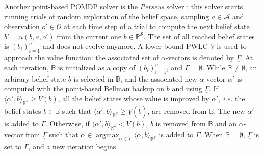 Another point-based POMDP solver is the \textit{Perseus} solver \cite{Spaan04techrep}:
this solver starts running trials of random exploration of the belief space,
sampling $a \in \mathcal{A}$ and observation $o' \in \mathcal{O}$ at each time step of a trial 
to compute the next belief state $b'=u(b,a,o')$ from the current one $b \in \mathbb{P}^{\mathcal{S}}$.
The set of all reached belief states is $(b_i)_{i=1}^{n}$ and does not evolve anymore. 
A lower bound PWLC $\underline{V}$ is used to approach the value function:
the associated set of $\alpha$-vectors is denoted by $\underline{\Gamma}$.
At each iteration, $\mathbb{B}$ is initialized as a copy of $(b_i)_{i=1}^{n}$,
and $\Gamma = \emptyset$. 
While $\mathbb{B} \neq \emptyset$, an arbirary belief state $b$ is selected in $\mathbb{B}$,
and the associated new $\alpha$-vector $\alpha'$ is computed with the point-based Bellman backup on $b$ 
and using $\underline{\Gamma}$.
If $\langle \alpha', b \rangle_{\mathbb{R}^{\mathcal{S}}} \geqslant \underline{V}(b)$,
all the belief states whose value is improved by $\alpha'$,
\textit{i.e.} the belief states $\tilde{b} \in \mathbb{B}$ such that
$\langle \alpha', \tilde{b} \rangle_{\mathbb{R}^{\mathcal{S}}} \geqslant \underline{V}(\tilde{b}) $, are removed from $\mathbb{B}$.
The new $\alpha'$ is added to $\Gamma$.
Otherwise, if $\langle \alpha', b \rangle_{\mathbb{R}^{\mathcal{S}}} < \underline{V}(b)$,
$b$ is removed from $\mathbb{B}$ and an $\alpha$-vector from  
$\underline{\Gamma}$ such that $\tilde{\alpha} \in \operatorname*{argmax}_{\alpha \in \underline{\Gamma}} \langle \alpha, b \rangle_{\mathbb{R}^{\mathcal{S}}}$ 
is added to $\Gamma$. When $\mathbb{B} = \emptyset$, $\underline{\Gamma}$ is set to $\Gamma$,
and a new iteration begins.

